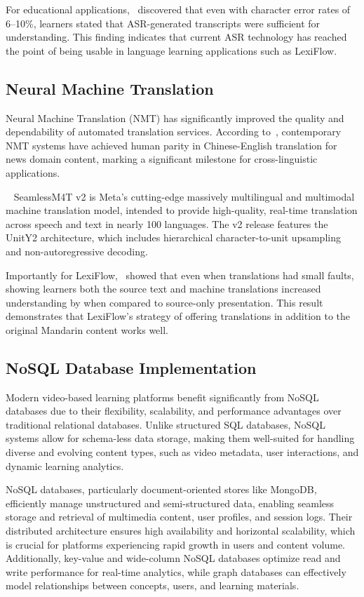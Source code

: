 \documentclass[oneside]{utmthesis}
\begin{document}
For educational applications,~\citet{sutomo2024} discovered that even with character error rates of 6--10\%, learners stated that ASR-generated transcripts were sufficient for understanding. This finding indicates that current ASR technology has reached the point of being usable in language learning applications such as LexiFlow.
\subsection{Neural Machine Translation}
Neural Machine Translation (NMT) has significantly improved the quality and dependability of automated translation services.  According to~\citet{hassan2018}, contemporary NMT systems have achieved human parity in Chinese-English translation for news domain content, marking a significant milestone for cross-linguistic applications.

~\citet{barrault2023seamless}  SeamlessM4T v2 is Meta's cutting-edge massively multilingual and multimodal machine translation model, intended to provide high-quality, real-time translation across speech and text in nearly 100 languages.  The v2 release features the UnitY2 architecture, which includes hierarchical character-to-unit upsampling and non-autoregressive decoding.

Importantly for LexiFlow,~\citet{gary2024} showed that even when translations had small faults, showing learners both the source text and machine translations increased understanding by when compared to source-only presentation. This result demonstrates that LexiFlow's strategy of offering translations in addition to the original Mandarin content works well.

\subsection{NoSQL Database Implementation}
Modern video-based learning platforms benefit significantly from NoSQL databases due to their flexibility, scalability, and performance advantages over traditional relational databases. Unlike structured SQL databases, NoSQL systems allow for schema-less data storage, making them well-suited for handling diverse and evolving content types, such as video metadata, user interactions, and dynamic learning analytics.

NoSQL databases, particularly document-oriented stores like MongoDB, efficiently manage unstructured and semi-structured data, enabling seamless storage and retrieval of multimedia content, user profiles, and session logs. Their distributed architecture ensures high availability and horizontal scalability, which is crucial for platforms experiencing rapid growth in users and content volume. Additionally, key-value and wide-column NoSQL databases optimize read and write performance for real-time analytics, while graph databases can effectively model relationships between concepts, users, and learning materials.
\end{document}
